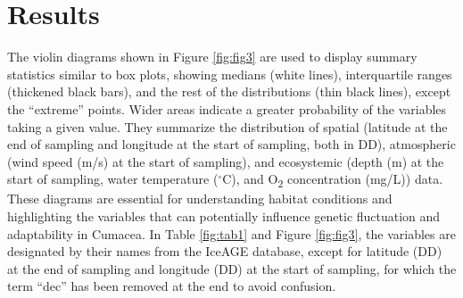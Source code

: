 {\section{Results}\label{results}
The violin diagrams shown in Figure \ref{fig:fig3} are used to display summary statistics similar to box plots, showing medians (white lines), interquartile ranges (thickened black bars), and the rest of the distributions (thin black lines), except the ``extreme'' points. Wider areas indicate a greater probability of the variables taking a given value. They summarize the distribution of spatial (latitude at the end of sampling and longitude at the start of sampling, both in DD), atmospheric (wind speed (m/s) at the start of sampling), and ecosystemic (depth (m) at the start of sampling, water temperature ($^\circ$C), and O\textsubscript{2} concentration (mg/L)) data. These diagrams are essential for understanding habitat conditions and highlighting the variables that can potentially influence genetic fluctuation and adaptability in Cumacea. In Table \ref{fig:tab1} and Figure \ref{fig:fig3}, the variables are designated by their names from the IceAGE database, except for latitude (DD) at the end of sampling and longitude (DD) at the start of sampling, for which the term ``dec'' has been removed at the end to avoid confusion.

}
